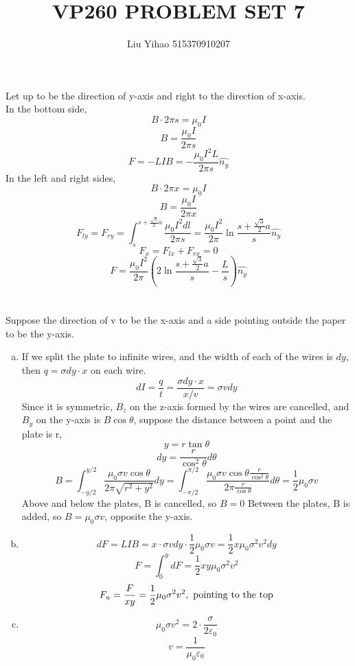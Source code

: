 \documentclass{article}
\title{VP260 PROBLEM SET 7}
\author{Liu Yihao 515370910207}
\date{}
\begin{document}
\maketitle

\section{}
Let up to be the direction of y-axis and right to the direction of x-axis.\\
In the bottom side,
$$B\cdot2\pi s=\mu_0I$$
$$B=\frac{\mu_0I}{2\pi s}$$
$$F=-LIB=-\frac{\mu_0I^2L}{2\pi s}\hat{n_y}$$
In the left and right sides,
$$B\cdot2\pi x=\mu_0I$$
$$B=\frac{\mu_0I}{2\pi x}$$
$$F_{ly}=F_{ry}=\int_s^{s+\frac{\sqrt{3}}{2}a}\frac{\mu_0I^2dl}{2\pi s}
=\frac{\mu_0I^2}{2\pi}\ln\frac{s+\frac{\sqrt{3}}{2}a}{s}\hat{n_y}$$
$$F_x=F_{lx}+F_{rx}=0$$
$$F=\frac{\mu_0I^2}{2\pi}\left(2\ln\frac{s+\frac{\sqrt{3}}{2}a}{s}-\frac{L}{s}\right)\hat{n_y}$$

\section{}
Suppose the direction of v to be the x-axis and a side pointing outside the paper to be the y-axis.
\begin{enumerate}[(a)]
\item
If we split the plate to infinite wires, and the width of each of the wires is $dy$,\\
then $q=\sigma dy\cdot x$ on each wire.
$$dI=\frac{q}{t}=\frac{\sigma dy\cdot x}{x/v}=\sigma vdy$$
Since it is symmetric, $B_z$ on the z-axis formed by the wires are cancelled, and $B_y$ on the y-axis is $B\cos\theta$, suppose the distance between a point and the plate is r,
$$y=r\tan\theta$$
$$dy=\frac{r}{\cos^2\theta}d\theta$$
$$B=\int_{-y/2}^{y/2}\frac{\mu_0\sigma v\cos\theta}{2\pi\sqrt{r^2+y^2}}dy=\int_{-\pi/2}^{\pi/2}\frac{\mu_0\sigma v\cos\theta\frac{r}{\cos^2\theta}}{2\pi\frac{r}{\cos\theta}}d\theta=\frac{1}{2}\mu_0\sigma v$$
Above and below the plates, B is cancelled, so $B=0$
Between the plates, B is added, so $B=\mu_0\sigma v$, opposite the y-axis.

\item
$$dF=LIB=x\cdot\sigma vdy\cdot\frac{1}{2}\mu_0\sigma v=\frac{1}{2}x\mu_0\sigma^2v^2dy$$
$$F=\int_0^ydF=\frac{1}{2}xy\mu_0\sigma^2v^2$$
$$F_u=\frac{F}{xy}=\frac{1}{2}\mu_0\sigma^2v^2,\ \rm{pointing\ to\ the\ top}$$

\item
$$\mu_0\sigma v^2=2\cdot\frac{\sigma}{2\varepsilon_0}$$
$$v=\frac{1}{\mu_0\varepsilon_0}$$

\end{enumerate}
\end{document}
